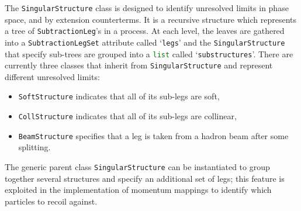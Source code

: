 \documentclass[11pt,a4paper]{article}
\newcommand{\py}[1]{\lstinline[language=python]{#1}}
\begin{document}
The \py{SingularStructure} class is designed to identify
unresolved limits in phase space, and by extension counterterms.
It is a recursive structure which represents a tree of \py{SubtractionLeg}'s
in a process.
At each level, the leaves are gathered
into a \py{SubtractionLegSet} attribute called `\py{legs}'
and the \py{SingularStructure} that specify sub-trees are grouped
into a \py{list} called `\py{substructures}'.
There are currently three classes that inherit from \py{SingularStructure}
and represent different unresolved limits:
\begin{itemize}
	\item \py{SoftStructure} indicates that all of its sub-legs are soft,
	\item \py{CollStructure} indicates
		that all of its sub-legs are collinear,
	\item \py{BeamStructure} specifies that a leg is taken from a hadron
		beam after some splitting.
\end{itemize}
The generic parent class \py{SingularStructure} can be instantiated
to group together several structures and specify an additional set of legs;
this feature is exploited in the implementation of momentum mappings
to identify which particles to recoil against.
\end{document}
